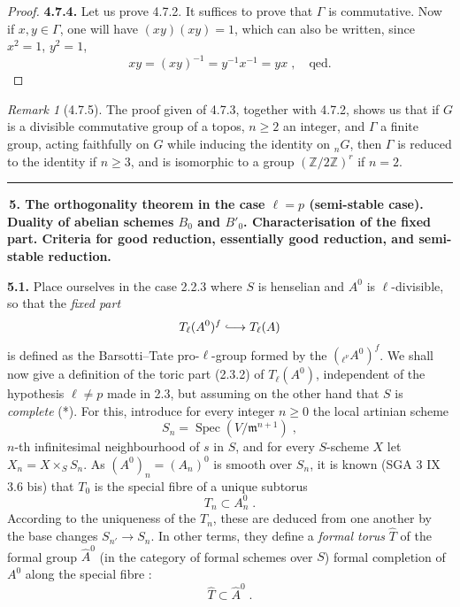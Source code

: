 \documentclass[11pt]{article}
\theoremstyle{plain}
\theoremstyle{definition}
\theoremstyle{remark}
\newtheorem{remarque}[theorem]{Remark}
\newcommand{\ZZ}{\mathbb Z}
\DeclareMathOperator{\Spec}{Spec}
\newcommand{\Tl}{T_\ell}
\newcommand{\frakm}{\mathfrak m}
\providecommand{\S}{\mathcal{S}}
\begin{document}
\begin{proof}
\medskip

\noindent\textbf{4.7.4.} Let us prove 4.7.2. It suffices to prove that
$\Gamma$ is commutative. Now if $x, y \in \Gamma$, one will have
$(xy)(xy) = 1$, which can also be written, since $x^2 = 1$, $y^2 = 1$,
\[
xy = (xy)^{-1} = y^{-1}x^{-1} = yx \; , \quad \text{qed.}
\]

\end{proof}

\begin{remarque}[4.7.5]
The proof given of 4.7.3, together with 4.7.2, shows us that if $G$ is
a divisible commutative group of a topos, $n \geq 2$ an integer, and
$\Gamma$ a finite group, acting faithfully on $G$ while inducing the
identity on ${}_n G$, then $\Gamma$ is reduced to the identity if $n
\geq 3$, and is isomorphic to a group $(\ZZ/2\ZZ)^r$ if $n = 2$.
\end{remarque}

\newpage
\hrule
\medskip

\noindent\textbf{\large \S\,5. The orthogonality theorem in the case
$\ell = p$ (semi-stable case). Duality of abelian schemes $B_0$ and
$B'_0$. Characterisation of the fixed part. Criteria for good
reduction, essentially good reduction, and semi-stable reduction.}

\smallskip

\noindent\textbf{5.1.} Place ourselves in the case 2.2.3 where $S$ is
henselian and $A^0$ is $\ell$-divisible, so that the \emph{fixed part}
\[
\Tl(A^0)^f \lhook\joinrel\longrightarrow \Tl(A)
\]
is defined as the Barsotti--Tate pro-$\ell$-group formed by the
$({}_{\ell^{\nu}}\!A^0)^f$. We shall now give a definition of the toric
part (2.3.2) of $\Tl(A^0)$, independent of the hypothesis $\ell \neq p$
made in 2.3, but assuming on the other hand that $S$ is \emph{complete}
(*). For this, introduce for every integer $n \geq 0$ the local artinian
scheme
\begin{equation}
S_n = \Spec(V/\frakm^{n+1}) \; ,
\end{equation}
$n$-th infinitesimal neighbourhood of $s$ in $S$, and for every
$S$-scheme $X$ let $X_n = X \times_S S_n$. As $(A^0)_n = (A_n)^0$ is
smooth over $S_n$, it is known (SGA 3 IX 3.6 bis) that $T_0$ is the
special fibre of a unique subtorus
\begin{equation}
T_n \subset A_n^0 \; .
\end{equation}
According to the uniqueness of the $T_n$, these are deduced from one
another by the base changes $S_{n'} \to S_n$. In other terms, they define
a \emph{formal torus} $\hat{T}$ of the formal group $\hat{A}^0$ (in the
category of formal schemes over $S$) formal completion of $A^0$ along
the special fibre :
\begin{equation}
\hat{T} \subset \hat{A}^0 \; .
\end{equation}
\end{document}
